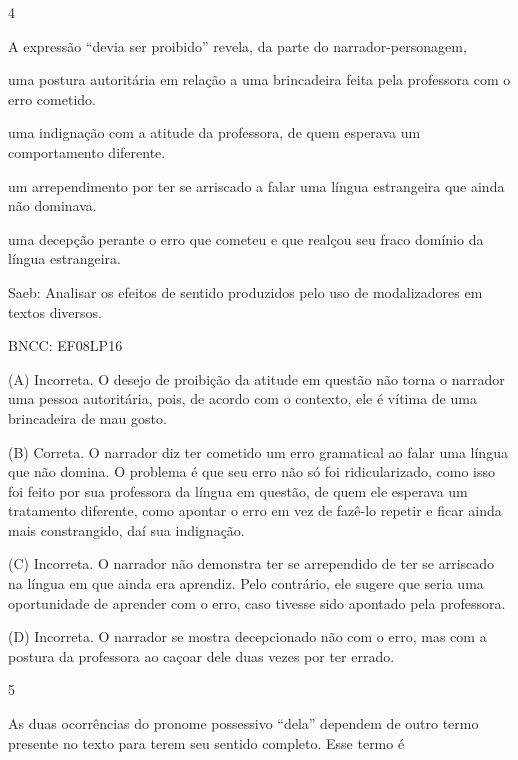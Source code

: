 
\num{4}

A expressão ``devia ser proibido'' revela, da parte do
narrador-personagem,

\begin{escolha}
\item uma postura autoritária em relação a uma brincadeira feita pela
professora com o erro cometido.

\item uma indignação com a atitude da professora, de quem esperava um
comportamento diferente.

\item um arrependimento por ter se arriscado a falar uma língua estrangeira
que ainda não dominava.

\item uma decepção perante o erro que cometeu e que realçou seu fraco
domínio da língua estrangeira.
\end{escolha}

Saeb: Analisar os efeitos de sentido produzidos pelo uso de
modalizadores em textos diversos.

BNCC: EF08LP16

(A) Incorreta. O desejo de proibição da atitude em questão não torna o
narrador uma pessoa autoritária, pois, de acordo com o contexto, ele é
vítima de uma brincadeira de mau gosto.

(B) Correta. O narrador diz ter cometido um erro gramatical ao falar uma
língua que não domina. O problema é que seu erro não só foi
ridicularizado, como isso foi feito por sua professora da língua em
questão, de quem ele esperava um tratamento diferente, como apontar o
erro em vez de fazê-lo repetir e ficar ainda mais constrangido, daí sua
indignação.

(C) Incorreta. O narrador não demonstra ter se arrependido de ter se
arriscado na língua em que ainda era aprendiz. Pelo contrário, ele
sugere que seria uma oportunidade de aprender com o erro, caso tivesse
sido apontado pela professora.

(D) Incorreta. O narrador se mostra decepcionado não com o erro, mas com
a postura da professora ao caçoar dele duas vezes por ter errado.

\num{5}

As duas ocorrências do pronome possessivo ``dela'' dependem de outro
termo presente no texto para terem seu sentido completo. Esse termo é


